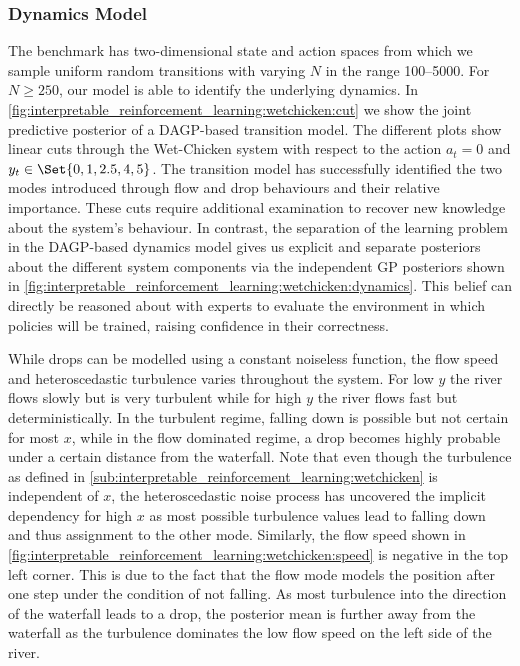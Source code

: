 \subsubsection{Dynamics Model}
\label{sub:interpretable_reinforcement_learning:dynamics_model}
The benchmark has two-dimensional state and action spaces from which we sample uniform random transitions with varying $N$ in the range \numrange{100}{5000}.
For $N \geq 250$, our model is able to identify the underlying dynamics.
In \cref{fig:interpretable_reinforcement_learning:wetchicken:cut} we show the joint predictive posterior of a DAGP-based transition model.
The different plots show linear cuts through the Wet-Chicken system with respect to the action $a_t = 0$ and $y_t \in \Set{0, 1, 2.5, 4, 5}$.
The transition model has successfully identified the two modes introduced through flow and drop behaviours and their relative importance.
These cuts require additional examination to recover new knowledge about the system's behaviour.
In contrast, the separation of the learning problem in the DAGP-based dynamics model gives us explicit and separate posteriors about the different system components via the independent GP posteriors shown in \cref{fig:interpretable_reinforcement_learning:wetchicken:dynamics}.
This belief can directly be reasoned about with experts to evaluate the environment in which policies will be trained, raising confidence in their correctness.

While drops can be modelled using a constant noiseless function, the flow speed and heteroscedastic turbulence varies throughout the system.
For low $y$ the river flows slowly but is very turbulent while for high $y$ the river flows fast but deterministically.
In the turbulent regime, falling down is possible but not certain for most $x$, while in the flow dominated regime, a drop becomes highly probable under a certain distance from the waterfall.
Note that even though the turbulence as defined in \cref{sub:interpretable_reinforcement_learning:wetchicken} is independent of $x$, the heteroscedastic noise process has uncovered the implicit dependency for high $x$ as most possible turbulence values lead to falling down and thus assignment to the other mode.
Similarly, the flow speed shown in \cref{fig:interpretable_reinforcement_learning:wetchicken:speed} is negative in the top left corner.
This is due to the fact that the flow mode models the position after one step under the condition of not falling.
As most turbulence into the direction of the waterfall leads to a drop, the posterior mean is further away from the waterfall as the turbulence dominates the low flow speed on the left side of the river.


